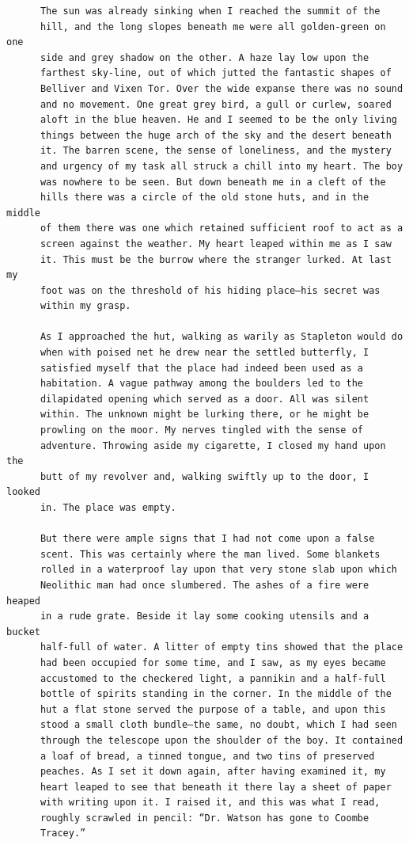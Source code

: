\documentclass{article}
\begin{document}
\begin{verbatim}
      The sun was already sinking when I reached the summit of the
      hill, and the long slopes beneath me were all golden-green on one
      side and grey shadow on the other. A haze lay low upon the
      farthest sky-line, out of which jutted the fantastic shapes of
      Belliver and Vixen Tor. Over the wide expanse there was no sound
      and no movement. One great grey bird, a gull or curlew, soared
      aloft in the blue heaven. He and I seemed to be the only living
      things between the huge arch of the sky and the desert beneath
      it. The barren scene, the sense of loneliness, and the mystery
      and urgency of my task all struck a chill into my heart. The boy
      was nowhere to be seen. But down beneath me in a cleft of the
      hills there was a circle of the old stone huts, and in the middle
      of them there was one which retained sufficient roof to act as a
      screen against the weather. My heart leaped within me as I saw
      it. This must be the burrow where the stranger lurked. At last my
      foot was on the threshold of his hiding place—his secret was
      within my grasp.

      As I approached the hut, walking as warily as Stapleton would do
      when with poised net he drew near the settled butterfly, I
      satisfied myself that the place had indeed been used as a
      habitation. A vague pathway among the boulders led to the
      dilapidated opening which served as a door. All was silent
      within. The unknown might be lurking there, or he might be
      prowling on the moor. My nerves tingled with the sense of
      adventure. Throwing aside my cigarette, I closed my hand upon the
      butt of my revolver and, walking swiftly up to the door, I looked
      in. The place was empty.

      But there were ample signs that I had not come upon a false
      scent. This was certainly where the man lived. Some blankets
      rolled in a waterproof lay upon that very stone slab upon which
      Neolithic man had once slumbered. The ashes of a fire were heaped
      in a rude grate. Beside it lay some cooking utensils and a bucket
      half-full of water. A litter of empty tins showed that the place
      had been occupied for some time, and I saw, as my eyes became
      accustomed to the checkered light, a pannikin and a half-full
      bottle of spirits standing in the corner. In the middle of the
      hut a flat stone served the purpose of a table, and upon this
      stood a small cloth bundle—the same, no doubt, which I had seen
      through the telescope upon the shoulder of the boy. It contained
      a loaf of bread, a tinned tongue, and two tins of preserved
      peaches. As I set it down again, after having examined it, my
      heart leaped to see that beneath it there lay a sheet of paper
      with writing upon it. I raised it, and this was what I read,
      roughly scrawled in pencil: “Dr. Watson has gone to Coombe
      Tracey.”


\end{verbatim}
\end{document}
